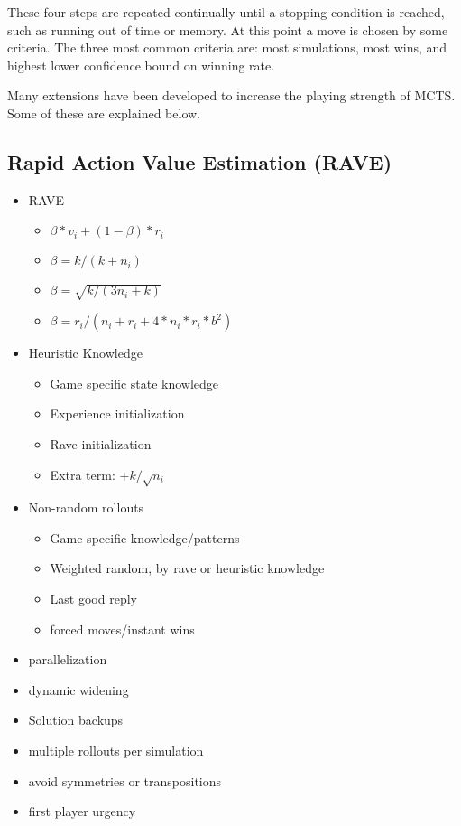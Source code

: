 These four steps are repeated continually until a stopping condition is reached, such as running out of time or memory. At this point a move is chosen by some criteria. The three most common criteria are: most simulations, most wins, and highest lower confidence bound on winning rate.

Many extensions have been developed to increase the playing strength of MCTS. Some of these are explained below.

\subsection{Rapid Action Value Estimation (RAVE)}

\begin{itemize}
\item RAVE
	\begin{itemize}
		\item $\beta*v_i + (1-\beta)*r_i$
		\item $\beta = k/(k+n_i)$
		\item $\beta = \sqrt{k/(3n_i+k)}$
		\item $\beta = r_i/(n_i+r_i+4*n_i*r_i*b^2)$
	\end{itemize}
\item Heuristic Knowledge
	\begin{itemize}
		\item Game specific state knowledge
		\item Experience initialization
		\item Rave initialization
		\item Extra term: $ + k/\sqrt{n_i}$
	\end{itemize}
\item Non-random rollouts
	\begin{itemize}
		\item Game specific knowledge/patterns
		\item Weighted random, by rave or heuristic knowledge
		\item Last good reply
		\item forced moves/instant wins
	\end{itemize}
\item parallelization
\item dynamic widening
\item Solution backups
\item multiple rollouts per simulation
\item avoid symmetries or transpositions
\item first player urgency

\end{itemize}















